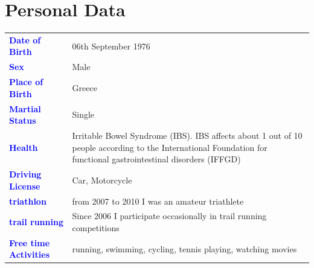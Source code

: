 \documentclass[11pt, a4paper]{awesome-cv}
\begin{document}
\pagebreak

\bigskip
\bigskip

\hypertarget{personal-data}{%
\section{Personal Data}\label{personal-data}}

\bigskip

\begin{table}[H]
\centering\begingroup\fontsize{9}{11}\selectfont

\begin{tabular}{>{}l>{\raggedright\arraybackslash}p{30em}}
\toprule
\textcolor{blue}{\textbf{Date of Birth}} & 06th  September 1976\\
\textcolor{blue}{\textbf{Sex}} & Male\\
\textcolor{blue}{\textbf{Place of Birth}} & Greece\\
\textcolor{blue}{\textbf{Martial Status}} & Single\\
\textcolor{blue}{\textbf{Health}} & Irritable Bowel Syndrome (IBS).  IBS affects about 1 out of 10 people according to the International Foundation for functional gastrointestinal disorders (IFFGD)\\
\addlinespace
\textcolor{blue}{\textbf{Driving License}} & Car,  Motorcycle\\
\textcolor{blue}{\textbf{triathlon}} & from 2007 to 2010 I was an amateur triathlete\\
\textcolor{blue}{\textbf{trail running}} & Since 2006 I participate occasionally in trail running competitions\\
\textcolor{blue}{\textbf{Free time Activities}} & running, swimming, cycling, tennis playing, watching movies\\
\bottomrule
\end{tabular}
\endgroup{}
\end{table}
\end{document}
